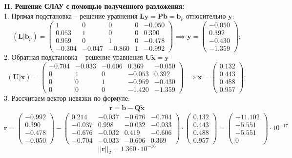 \documentclass[a4paper]{article}
\begin{document}
{\large\bf II. Решение СЛАУ с помощью полученного разложения:}\\
1. Прямая подстановка -- решение уравнения $\mathbf{Ly} = \mathbf{Pb}=\mathbf{b}_p$ относительно $\mathbf{y}$:
\[
(\mathbf{L}|\mathbf{b}_p) =
\left(
\begin{array}{cccc|c}
    1    &  0    &  0    & 0 &-0.050 \\
    0.053&  1    &  0    & 0 & 0.390 \\
    0.959&  0    &  1    & 0 &-0.478 \\
   -0.304& -0.047& -0.860& 1 &-0.992
\end{array}
\right) \implies
\mathbf{y} =
\begin{pmatrix}
    -0.050 \\
     0.392 \\
    -0.430 \\
    -1.359
\end{pmatrix};
\]
2. Обратная подстановка -- решение уравнения $\mathbf{U}\widetilde{\mathbf{x}} = \mathbf{y}$
\[
(\mathbf{U}|\widetilde{\mathbf{x}}) =
\left(
\begin{array}{cccc|c}
    -0.704& -0.033& -0.606& 0.369& -0.050\\
    0    &  1    &  0    & -0.053&  0.392 \\
    0    &  0    &  1    & -0.959& -0.430\\
    0    &  0    &  0    & -1.420& -1.359
\end{array}
\right) \implies
\widetilde{\mathbf{x}} =
\begin{pmatrix}
   0.132\\
   0.443\\
   0.488\\
   0.957
\end{pmatrix};
\]
3. Рассчитаем вектор невязки по формуле:
\begin{align}
    \mathbf{r}=\mathbf{b}-\textbf{Q}\widetilde{\mathbf{x}}
\end{align}
\[
\mathbf{r}=
\begin{pmatrix}
    -0.992 \\
     0.390 \\
    -0.478 \\
    -0.050
\end{pmatrix} -
\begin{pmatrix}
     0.214 & -0.037 & -0.676 & -0.704 \\
    -0.037 &  0.998 & -0.032 & -0.033 \\
    -0.676 & -0.032 &  0.419 & -0.606 \\
    -0.704 & -0.033 & -0.606 &  0.369
\end{pmatrix} \cdot
\begin{pmatrix}
    0.132\\
    0.443\\
    0.488\\
    0.957
\end{pmatrix} =
\begin{pmatrix}
   -11.102\\
    -5.551\\
    -5.551\\
    0
\end{pmatrix} \cdot 10^{-17}
\]
\[
||\mathbf{r}||_2=1.360\cdot10^{-16}
\]
\end{document}
